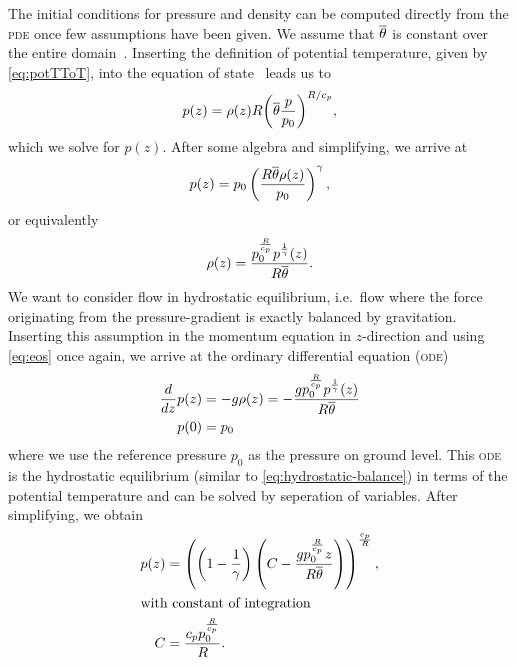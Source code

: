The initial conditions for pressure and density can be computed directly from the \textsc{pde} once few assumptions have been given.
We assume that $\overline{\theta}$ is constant over the entire domain~\cite{giraldo2008study}.
Inserting the definition of potential temperature, given by \cref{eq:potTToT}, into the equation of state~ leads us to
\begin{equation}
  p(z) = \rho(z) R {\left( \overline{\theta} \frac{p}{p_0}\right)}^{R/c_p},
\end{equation}
which we solve for $p(z)$.
After some algebra and simplifying, we arrive at
\begin{equation}
 p(z) = p_0 \left( \frac{R \overline{\theta} \rho(z)}{p_0} \right)^{\gamma},
\end{equation}
or equivalently
\begin{equation}
  \label{eq:eos-potT}
\rho(z) = \frac{p_{0}^{\frac{R}{c_{p}}} p^{\frac{1}{\gamma}}{\left (z \right )}}{R \overline{\theta}}.
\end{equation}
We want to consider flow in hydrostatic equilibrium, i.e.\ flow where the force originating from the pressure-gradient is exactly balanced by gravitation.
Inserting this assumption in the momentum equation in $z$-direction and using \cref{eq:eos} once again, we arrive at the ordinary differential equation (\textsc{ode})
\begin{align}
  \label{eq:hydrostatic-balance-potT}
  \begin{split}
  \frac{d}{d z} p{\left (z \right )} &= -g \rho(z)
                                     = 
        - \frac{g p_{0}^{\frac{R}{c_{p}}} p^{\frac{1}{\gamma}}{\left (z \right )}}{R \overline{\theta}}\\
  p{\left (0 \right )} &= p_0
  \end{split}
\end{align}
where we use the reference pressure $p_0$ as the pressure on ground level.
This \textsc{ode} is the hydrostatic equilibrium (similar to \cref{eq:hydrostatic-balance}) in terms of the potential temperature and can be solved by seperation of variables.
After simplifying, we obtain
\begin{align}
  \label{eq:hydrostatic-background-pressure}
p(z) &= \left(\left(1 - \frac{1}{\gamma}\right) \left(C - \frac{g p_{0}^{\frac{R}{c_{p}}} z}{R \overline{\theta}}\right)\right)^{\frac{c_{p}}{R}},\\
\shortintertext{with constant of integration}
 C &= \frac{c_{p} p_{0}^{\frac{R}{c_{p}}}}{R}.
\end{align}

